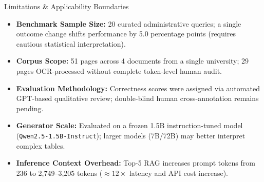 \begin{frame}{Limitations \& Applicability Boundaries}
  \vspace{0.1cm}
  \begin{itemize}
    \setlength{\itemsep}{0.28cm}
    \item \textbf{Benchmark Sample Size:} 20 curated administrative queries; a single outcome change shifts performance by 5.0 percentage points (requires cautious statistical interpretation).
    \item \textbf{Corpus Scope:} 51 pages across 4 documents from a single university; 29 pages OCR-processed without complete token-level human audit.
    \item \textbf{Evaluation Methodology:} Correctness scores were assigned via automated GPT-based qualitative review; double-blind human cross-annotation remains pending.
    \item \textbf{Generator Scale:} Evaluated on a frozen 1.5B instruction-tuned model (\texttt{Qwen2.5-1.5B-Instruct}); larger models (7B/72B) may better interpret complex tables.
    \item \textbf{Inference Context Overhead:} Top-5 RAG increases prompt tokens from 236 to 2,749--3,205 tokens ($\approx 12\times$ latency and API cost increase).
  \end{itemize}

\end{frame}
